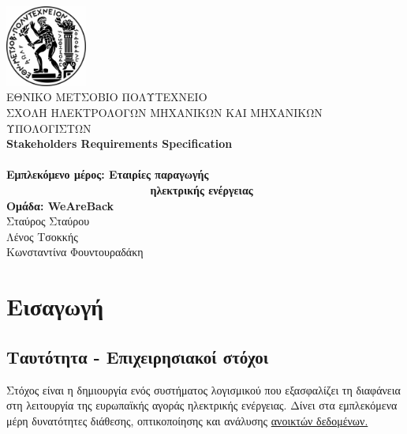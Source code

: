 \documentclass[a4paper,12pt, oneside]{article}
\begin{document}
\begin{titlepage}
\begin{center}

\includegraphics[width=0.20\textwidth]{./img/NTUAlogo.jpg}~\\[0.1cm]
\textsc{ ΕΘΝΙΚΟ ΜΕΤΣΟΒΙΟ ΠΟΛΥΤΕΧΝΕΙΟ}\\[0.2cm]  
\textsc{ ΣΧΟΛΗ ΗΛΕΚΤΡΟΛΟΓΩΝ ΜΗΧΑΝΙΚΩΝ ΚΑΙ ΜΗΧΑΝΙΚΩΝ ΥΠΟΛΟΓΙΣΤΩΝ}\\[3cm] 


\textbf{\LARGE \textlatin{Stakeholders Requirements Specification}}\\[0.01cm]
\\[2cm]

\textbf{\Large Εμπλεκόμενο μέρος: Εταιρίες παραγωγής\\ ~~~~~~~~~~~~~~~~~~~~~~ ηλεκτρικής ενέργειας}\\[2cm]

\textbf{Ομάδα:  \textlatin{WeAreBack}}\\
	Σταύρος Σταύρου \\
	Λένος Τσοκκής \\ 
	Κωνσταντίνα Φουντουραδάκη
\vfill

\end{center} 
\end{titlepage}

\thispagestyle{empty}
\newpage

\thispagestyle{empty}
\setcounter{page}{2}
\tableofcontents
\newpage


\section{Εισαγωγή}
\subsection{Ταυτότητα - Επιχειρησιακοί στόχοι}
Στόχος είναι η δημιουργία ενός συστήματος λογισμικού που εξασφαλίζει τη διαφάνεια στη λειτουργία της ευρωπαϊκής αγοράς ηλεκτρικής ενέργειας. Δίνει στα εμπλεκόμενα μέρη δυνατότητες διάθεσης, οπτικοποίησης και ανάλυσης \href{https://transparency.entsoe.eu}{ανοικτών δεδομένων.}
\end{document}
